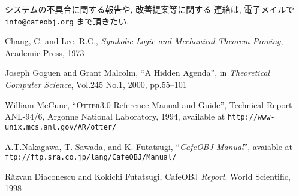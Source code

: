 \documentclass[a4paper,oneside]{memoir}
\begin{document}
システムの不具合に関する報告や, 改善提案等に関する
連絡は, 電子メイルで \texttt{info@cafeobj.org} まで頂きたい.

\newpage
\tableofcontents
\newpage
{}
\mainmatter







\newpage

\begin{center}
\begin{thebibliography}{99}\itemsep=0pt

 Chang, C. and Lee. R.C.,
  \textsl{Symbolic Logic and Mechanical Theorem Proving},
  Academic Press, 1973

 Joseph Goguen and Grant Malcolm, ``A Hidden Agenda'', in
  \emph{Theoretical Computer Science}, Vol.245 No.1, 2000, pp.55--101

 William McCune, ``\textsc{Otter3.0} Reference Manual
  and Guide'', Technical Report ANL-94/6, Argonne National Laboratory,
  1994, available at \texttt{http://www-unix.mcs.anl.gov/AR/otter/}

 A.T.Nakagawa, T. Sawada, and K. Futatsugi,
  ``\textsl{CafeOBJ Manual}'', avaiable at 
  \texttt{ftp://ftp.sra.co.jp/lang/CafeOBJ/Manual/}

 R\u{a}zvan Diaconescu and Kokichi Futatsugi,
  \textsf{CafeOBJ} \emph{Report}. World Scientific, 1998

\end{thebibliography}
\end{center}
\end{document}
